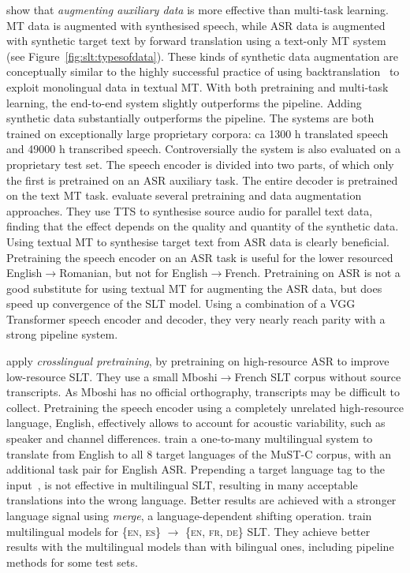\documentclass{svjour3}
\newcommand{\lp}[2]{#1$\rightarrow$#2}
\begin{document}
\citet{jia2019leveraging} show that \emph{augmenting auxiliary data} is more effective than multi-task learning.
MT data is augmented with synthesised speech, while ASR data is augmented with synthetic target text by forward translation using a text-only MT system (see Figure~\ref{fig:slt:typesofdata}).
These kinds of synthetic data augmentation are conceptually similar to the highly successful practice of
using backtranslation~\citep{sennrich2016improving} to exploit monolingual data in textual MT.
With both pretraining and multi-task learning, the end-to-end system slightly outperforms the pipeline.
Adding synthetic data substantially outperforms the pipeline.
The systems are both trained on exceptionally large proprietary corpora: 
ca 1300 h translated speech and 49000 h transcribed speech.
Controversially the system is also evaluated on a proprietary test set.
The speech encoder is divided into two parts, of which only the first is pretrained on an ASR auxiliary task.
The entire decoder is pretrained on the text MT task.
\citet{pino2019harnessing} evaluate several pretraining and data augmentation approaches.
They use TTS to synthesise source audio for parallel text data,
finding that the effect depends on the quality and quantity of the synthetic data.
Using textual MT to synthesise target text from ASR data is clearly beneficial.
Pretraining the speech encoder on an ASR task is useful for the lower resourced \lp{English}{Romanian}, but not for \lp{English}{French}.
Pretraining on ASR is not a good substitute for using textual MT for augmenting the ASR data,
but does speed up convergence of the SLT model.
Using a combination of a VGG Transformer speech encoder and decoder,
they very nearly reach parity with a strong pipeline system.





\citet{bansal2019pre} apply \emph{crosslingual pretraining}, by pretraining on high-resource ASR to improve low-resource SLT.
They use a small \lp{Mboshi}{French} SLT corpus without source transcripts.
As Mboshi has no official orthography, transcripts may be difficult to collect.
Pretraining the speech encoder using a completely unrelated high-resource language, English,
effectively allows to account for acoustic variability, such as speaker and channel differences.
\citet{gangi2019onetomany} train a one-to-many multilingual system to translate from English
to all 8 target languages of the \mbox{MuST-C} corpus,
with an additional task pair for English ASR.
Prepending a target language tag to the input~\citep{johnson-googles-2016}, is not effective in multilingual SLT,
resulting in many acceptable translations into the wrong language.
Better results are achieved with a stronger language signal using \textit{merge},
a language-dependent shifting operation.
\citet{inaguma2019multilingual} train multilingual models for
\{\textsc{en, es}\} $\rightarrow$ \{\textsc{en, fr, de}\} SLT.
They achieve better results with the multilingual models than with bilingual ones,
including pipeline methods for some test sets.
\end{document}
